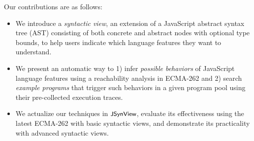 Our contributions are as follows:
\begin{itemize}
  \item We introduce a \textit{syntactic view}, an extension of a JavaScript
    abstract syntax tree (AST) consisting of both concrete and abstract nodes
    with optional type bounds, to help users indicate which language features
    they want to understand.

  \item We present an automatic way to 1) infer \textit{possible behaviors} of
    JavaScript language features using a reachability analysis in ECMA-262 and
    2) search \textit{example programs} that trigger such behaviors in a given
    program pool using their pre-collected execution traces.

  \item We actualize our techniques in $\textsf{\small JSynView}$, evaluate its effectiveness using
    the latest ECMA-262 with  basic syntactic views, and demonstrate
    its practicality with  advanced syntactic views.
\end{itemize}
